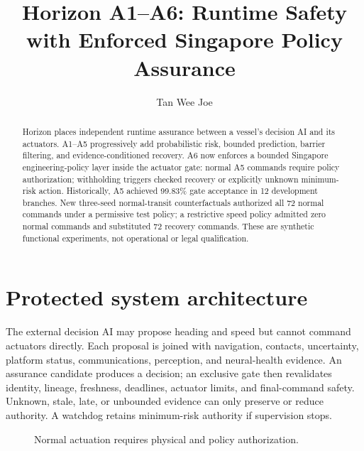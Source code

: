 \documentclass[sigconf,nonacm]{acmart}
\title{Horizon A1--A6: Runtime Safety with Enforced Singapore Policy Assurance}
\author{Tan Wee Joe}
\affiliation{\institution{University College London}\city{London}\country{United Kingdom}}
\begin{document}
\begin{abstract}
Horizon places independent runtime assurance between a vessel's decision AI and its actuators. A1--A5 progressively add probabilistic risk, bounded prediction, barrier filtering, and evidence-conditioned recovery. A6 now enforces a bounded Singapore engineering-policy layer inside the actuator gate: normal A5 commands require policy authorization; withholding triggers checked recovery or explicitly unknown minimum-risk action. Historically, A5 achieved 99.83\% gate acceptance in 12 development branches. New three-seed normal-transit counterfactuals authorized all 72 normal commands under a permissive test policy; a restrictive speed policy admitted zero normal commands and substituted 72 recovery commands. These are synthetic functional experiments, not operational or legal qualification.
\end{abstract}
\maketitle

\section{Protected system architecture}
The external decision AI may propose heading and speed but cannot command actuators directly. Each proposal is joined with navigation, contacts, uncertainty, platform status, communications, perception, and neural-health evidence. An assurance candidate produces a decision; an exclusive gate then revalidates identity, lineage, freshness, deadlines, actuator limits, and final-command safety. Unknown, stale, late, or unbounded evidence can only preserve or reduce authority. A watchdog retains minimum-risk authority if supervision stops.

\begin{figure}[b]
\centering
{}
\caption{Normal actuation requires physical and policy authorization.}
\label{fig:path}
\end{figure}
\end{document}
